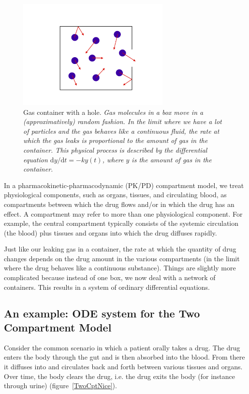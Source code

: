 \documentclass[11pt]{article}
\begin{document}
\begin{figure}[!htb]
\begin{center}
\includegraphics[width=3.0in,trim=0in 0in 0 0in]{graphics/GasInBox.png}
\caption{{Gas container with a hole. \textit{Gas molecules in a box move in a (approximatively)
random fashion. In the limit where we have a lot of particles and the gas behaves like a 
continuous fluid, the rate at which the gas leaks is proportional to the amount of gas in the container.
This physical process is described by the differential equation $ \mathrm{d}y/\mathrm{d}t = -ky(t)$, 
where $y$ is the amount of gas in the container.}}}
\label{GasContainer}
\end{center}
\end{figure}

  In a pharmacokinetic-pharmacodynamic (PK/PD) compartment model, we treat physiological
  components, such as organs, tissues, and circulating blood, as compartments between which
  the drug flows and/or in which the drug has an effect. A compartment may refer to more than  
  one physiological component. For example, the central compartment typically consists of the 
  systemic circulation (the blood) plus tissues and organs into which the drug diffuses rapidly.

  Just like our leaking gas in a container, the rate at which the quantity of drug changes depends
  on the drug amount in the various compartments (in the limit where the drug behaves like a 
  continuous substance). Things are slightly more complicated because instead of one box, 
  we now deal with a network of containers. This results in a system of ordinary differential equations.
  
  \subsection{An example: ODE system for the Two Compartment Model}
  
Consider the common scenario in which a patient orally takes a drug. The drug enters the body
through the gut and is then absorbed into the blood. From there it diffuses into and circulates back
and forth between various tissues and organs. Over time, the body clears the drug, i.e. the drug exits 
the body (for instance through urine)  (figure~\ref{TwoCptNice}).
\end{document}
